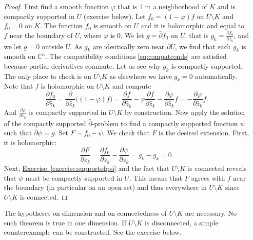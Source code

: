 \documentclass[12pt,openany]{book}
\newcommand{\C}{{\mathbb{C}}}
\theoremstyle{plain}
\theoremstyle{remark}
\theoremstyle{definition}
\theoremstyle{exercise}
\theoremstyle{example}
\newcommand{\exerciseref}[1]{\hyperref[#1]{Exercise~\ref*{#1}}}
\begin{document}
\begin{proof}
First find a smooth function $\varphi$ that is 1 in a neighborhood of
$K$ and is compactly supported in $U$ (exercise below).  Let
$f_0 = (1-\varphi)f$ on $U \setminus K$ and $f_0 = 0$ on $K$.  The function $f_0$
is smooth on $U$ and it is holomorphic
and equal to $f$ near the boundary of $U$, where $\varphi$ is 0.
We let $g = \bar{\partial} f_0$ on $U$, that is $g_k = \frac{\partial
f_0}{\partial \bar{z}_k}$,
and we let $g=0$ outside $U$.
As $g_k$ are identically zero near $\partial U$, we find that each
$g_k$ is smooth on $\C^n$.
The compatibility conditions
\eqref{eq:compatconds} are satisfied
because partial derivatives commute.
Let us see why $g_k$ is compactly supported.  The
only place to check is on $U \setminus K$ as elsewhere we have $g_k = 0$
automatically.  Note that $f$ is holomorphic on $U \setminus K$ and compute
\begin{equation*}
\frac{\partial f_0}{\partial \bar{z}_k}
=
\frac{\partial }{\partial \bar{z}_k}
\bigl((1-\varphi)f\bigr)
=
\frac{\partial f}{\partial \bar{z}_k}
- \varphi \frac{\partial f}{\partial \bar{z}_k}
- \frac{\partial \varphi}{\partial \bar{z}_k} f
=
- \frac{\partial \varphi}{\partial \bar{z}_k} f .
\end{equation*}
And 
$\frac{\partial \varphi}{\partial \bar{z}_k}$ is compactly supported in
$U \setminus K$ by construction.
Now apply the solution of the compactly supported $\bar{\partial}$-problem
to find a
compactly supported function $\psi$ such that $\bar{\partial}\psi = g$. 
Set $F = f_0 - \psi$.  We check that $F$ is the desired
extension.  First, it is holomorphic:
\begin{equation*}
\frac{\partial F}{\partial \bar{z}_k}
=
\frac{\partial f_0}{\partial \bar{z}_k}
-
\frac{\partial \psi}{\partial \bar{z}_k}
=
g_k
-
g_k
= 0 .
\end{equation*}
Next, \exerciseref{exercise:supportofpsi} and the fact that $U \setminus
K$ is connected reveals that $\psi$ must be compactly supported in $U$.
This means that $F$ agrees with $f$ near the boundary (in particular
on an open set) and thus everywhere in $U \setminus K$ since $U \setminus K$
is connected.
\end{proof}

The hypotheses on dimension and on connectedness of $U \setminus K$
are necessary.
No such theorem is true in one dimension.
If $U \setminus K$ is disconnected, a simple
counterexample can be constructed.
See the exercise below.
\end{document}
